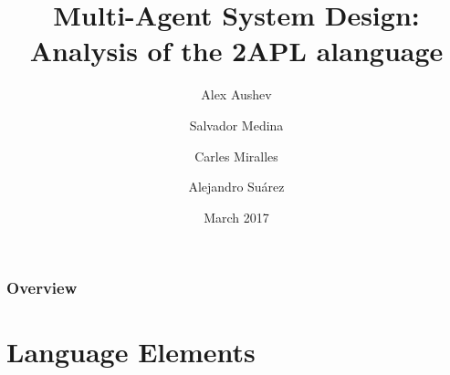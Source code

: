 \documentclass{beamer}
\title[Analysis of 2APL]{Multi-Agent System Design:\\Analysis of the 2APL alanguage} %
\author[Aushev \and Medina \and Miralles \and Su\'arez]{Alex Aushev \and Salvador Medina \and Carles Miralles \and Alejandro Su\'arez} %
\institute[UPC] %
{
Universitat Polit\`ecnica de Catalunya \\
}
\date{March 2017} %
\begin{document}
\begin{frame}
\titlepage %
\end{frame}

\begin{frame}
\frametitle{Overview} %
\tableofcontents %
\end{frame}




\section{Language Elements} 
\end{document}
